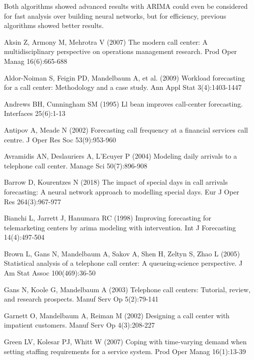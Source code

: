 \documentclass[12pt,a4paper]{article}
\theoremstyle{myplain}
\numberwithin{equation}{section}
\begin{document}
Both algorithms showed advanced results with ARIMA could even be considered for fast analysis over building neural networks, but for efficiency, previous algorithms showed better results.

\newpage
{}
{}
\begin{thebibliography}{X}

Aksin Z, Armony M, Mehrotra V (2007) The modern call center: A multidisciplinary perspective on operations management research. 
Prod Oper Manag 16(6):665-688

Aldor-Noiman S, Feigin PD, Mandelbaum A, et al. (2009) Workload forecasting for a call center: Methodology and a case study.
Ann Appl Stat 3(4):1403-1447

Andrews BH, Cunningham SM (1995) Ll bean improves call-center forecasting.
Interfaces 25(6):1-13

Antipov A, Meade N (2002) Forecasting call frequency at a financial services call centre.
J Oper Res Soc 53(9):953-960

Avramidis AN, Deslauriers A, L'Ecuyer P (2004) Modeling daily arrivals to a telephone call center.
Manage Sci 50(7):896-908

Barrow D, Kourentzes N (2018) The impact of special days in call arrivals forecasting: A neural network approach to modelling special days.
Eur J Oper Res 264(3):967-977

Bianchi L, Jarrett J, Hanumara RC (1998) Improving forecasting for telemarketing centers by arima modeling with intervention.
Int J Forecasting 14(4):497-504

Brown L, Gans N, Mandelbaum A, Sakov A, Shen H, Zeltyn S, Zhao L (2005) Statistical analysis of a telephone call center: A queueing-science perspective.
J Am Stat Assoc 100(469):36-50

Gans N, Koole G, Mandelbaum A (2003) Telephone call centers: Tutorial, review, and research prospects.
Manuf Serv Op 5(2):79-141

Garnett O, Mandelbaum A, Reiman M (2002) Designing a call center with impatient customers.
Manuf Serv Op 4(3):208-227

Green LV, Kolesar PJ, Whitt W (2007) Coping with time-varying demand when setting staffing requirements for a service system.
Prod Oper Manag 16(1):13-39


\end{thebibliography}
\end{document}
